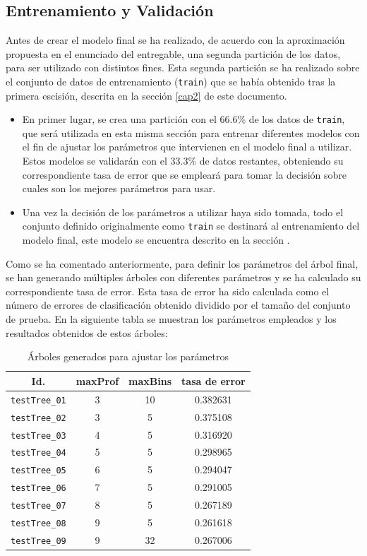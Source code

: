 \documentclass[12pt]{article}
\begin{document}
\subsection{Entrenamiento y Validación}
Antes de crear el modelo final se ha realizado, de acuerdo con la aproximación propuesta en el enunciado del entregable, una segunda partición de los datos, para ser utilizado con distintos fines. Esta segunda partición se ha realizado sobre el conjunto de datos de entrenamiento (\texttt{train}) que se había obtenido tras la primera escisión, descrita en la sección \ref{cap2} de este documento.
\begin{itemize}
    \item En primer lugar, se crea una partición con el 66.6\% de los datos de \texttt{train}, que será utilizada en esta misma sección para entrenar diferentes modelos con el fin de ajustar los parámetros que intervienen en el modelo final a utilizar. Estos modelos se validarán con el 33.3\% de datos restantes, obteniendo su correspondiente tasa de error que se empleará para tomar la decisión sobre cuales son los mejores parámetros para usar.
    \item Una vez la decisión de los parámetros a utilizar haya sido tomada, todo el conjunto definido originalmente como \texttt{train} se destinará al entrenamiento del modelo final, este modelo se encuentra descrito en la sección .
\end{itemize}

Como se ha comentado anteriormente, para definir los parámetros del árbol final, se han generando múltiples árboles con diferentes parámetros y se ha calculado su correspondiente tasa de error. Esta tasa de error ha sido calculada como el número de errores de clasificación obtenido dividido por el tamaño del conjunto de prueba. En la siguiente tabla se muestran los parámetros empleados y los resultados obtenidos de estos árboles:

\begin{table}[H]
\centering
\begin{tabular}{|c|c|c|c|}
\hline
Id.    & maxProf    & maxBins  & tasa de error  \\ \hline
\texttt{testTree\_01}  &   3   & 10  & 0.382631  \\ \hline
\texttt{testTree\_02}  &   3   & 5   & 0.375108   \\ \hline
\texttt{testTree\_03}  &   4   & 5   & 0.316920   \\ \hline
\texttt{testTree\_04}  &   5   & 5   & 0.298965   \\ \hline
\texttt{testTree\_05}  &   6   & 5   & 0.294047   \\ \hline
\texttt{testTree\_06}  &   7   & 5   & 0.291005   \\ \hline
\texttt{testTree\_07}  &   8   & 5   & 0.267189   \\ \hline
\texttt{testTree\_08}  &   9   & 5   & 0.261618   \\ \hline
\texttt{testTree\_09}  &   9   & 32   & 0.267006   \\ \hline
\end{tabular}
\caption{Árboles generados para ajustar los parámetros}
\end{table}
\end{document}
